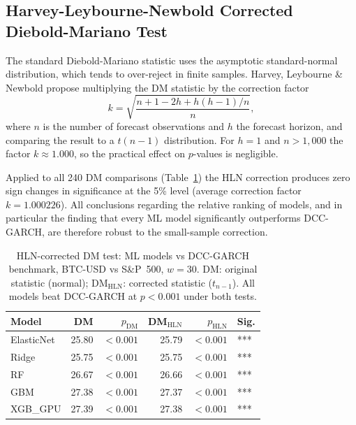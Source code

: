\subsection{Harvey-Leybourne-Newbold Corrected Diebold-Mariano Test}

The standard Diebold-Mariano statistic uses the asymptotic standard-normal
distribution, which tends to over-reject in finite samples.
Harvey, Leybourne \& Newbold \cite{harvey1997testing} propose multiplying
the DM statistic by the correction factor
\begin{equation}
    k = \sqrt{\frac{n + 1 - 2h + h(h-1)/n}{n}},
\end{equation}
where $n$ is the number of forecast observations and $h$ the forecast horizon,
and comparing the result to a $t(n-1)$ distribution.
For $h = 1$ and $n > 1{,}000$ the factor $k \approx 1.000$, so the practical
effect on $p$-values is negligible.

Applied to all 240 DM comparisons (Table~\ref{tab:dm_hln}) the HLN correction
produces zero sign changes in significance at the 5\% level (average correction
factor $k = 1.000226$).
All conclusions regarding the relative ranking of models, and in particular
the finding that every ML model significantly outperforms DCC-GARCH, are
therefore robust to the small-sample correction.

\begin{table}[H]
    \centering
    \caption{HLN-corrected DM test: ML models vs DCC-GARCH benchmark,
             BTC-USD vs S\&P~500, $w = 30$.
             DM: original statistic (normal); DM$_\text{HLN}$: corrected
             statistic ($t_{n-1}$).
             All models beat DCC-GARCH at $p < 0.001$ under both tests.}
    \label{tab:dm_hln}
    \begin{tabular}{lrrrrl}
        \toprule
        Model & DM & $p_\text{DM}$ & DM$_\text{HLN}$ & $p_\text{HLN}$ & Sig. \\
        \midrule
        ElasticNet & 25.80 & $<0.001$ & 25.79 & $<0.001$ & *** \\
        Ridge      & 25.75 & $<0.001$ & 25.75 & $<0.001$ & *** \\
        RF         & 26.67 & $<0.001$ & 26.66 & $<0.001$ & *** \\
        GBM        & 27.38 & $<0.001$ & 27.37 & $<0.001$ & *** \\
        XGB\_GPU   & 27.39 & $<0.001$ & 27.38 & $<0.001$ & *** \\
        \bottomrule
    \end{tabular}
\end{table}

\clearpage
